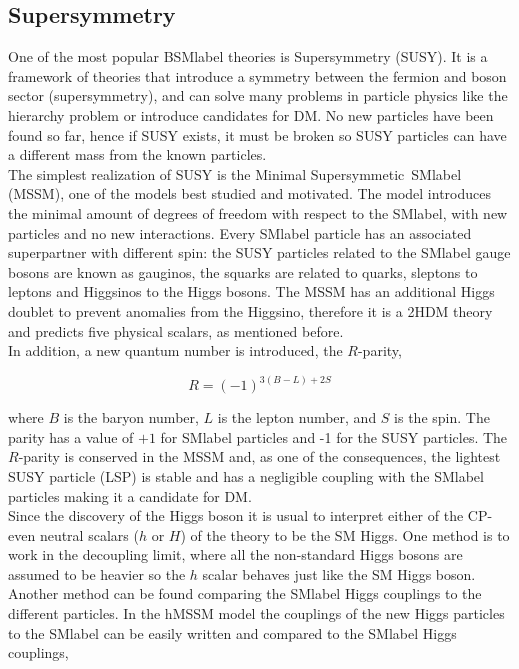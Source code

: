 \subsection{Supersymmetry}

One of the most popular \acrshort{BSMlabel} theories is Supersymmetry (SUSY). It is a framework of theories that introduce a symmetry between the fermion and boson sector (supersymmetry), and can solve many problems in particle physics like the hierarchy problem or introduce candidates for DM. No new particles have been found so far, hence if SUSY exists, it must be broken so SUSY particles can have a different mass from the known particles.\\

The simplest realization of SUSY is the Minimal Supersymmetic~\acrshort{SMlabel} (MSSM), one of the models best studied and motivated. The model introduces the minimal amount of degrees of freedom with respect to the \acrshort{SMlabel}, with new particles and no new interactions. Every \acrshort{SMlabel} particle has an associated superpartner with different spin: the SUSY particles related to the \acrshort{SMlabel} gauge bosons are known as gauginos, the squarks are related to quarks, sleptons to leptons and Higgsinos to the Higgs bosons. The MSSM has an additional Higgs doublet to prevent anomalies from the Higgsino, therefore it is a 2HDM theory and predicts five physical scalars, as mentioned before.\\

In addition, a new quantum number is introduced, the $R$-parity,

\begin{equation}
    R=(-1)^{3(B-L)+2S}
\end{equation}

where $B$ is the baryon number, $L$ is the lepton number, and $S$ is the spin. The parity has a value of $+1$ for \acrshort{SMlabel} particles and -1 for the SUSY particles. The $R$-parity is conserved in the MSSM and, as one of the consequences, the lightest SUSY particle (LSP) is stable and has a negligible coupling with the \acrshort{SMlabel} particles making it a candidate for DM.\\

Since the discovery of the Higgs boson it is usual to interpret either of the CP-even neutral scalars ($h$ or $H$) of the theory to be the SM Higgs. One method is to work in the decoupling limit, where  all the non-standard Higgs bosons are assumed to be heavier so the $h$ scalar behaves just like the SM Higgs boson. Another method can be found comparing the \acrshort{SMlabel} Higgs couplings to the different particles. In the hMSSM model %
the couplings of the new Higgs particles to the \acrshort{SMlabel} can be easily written and compared to the \acrshort{SMlabel} Higgs couplings,

